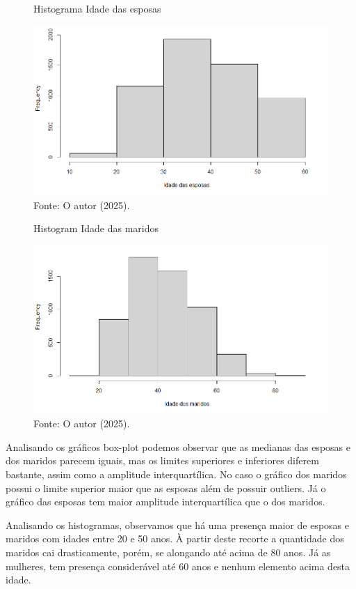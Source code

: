 \begin{figure}[H]
\centering
\caption{Histograma Idade das esposas}
\includegraphics[width=1\linewidth]{apendices/fig/4_IAA004_3.png}
\caption*{Fonte: O autor (2025).}
\end{figure}
\begin{figure}[H]
\centering
\caption{Histogram Idade das maridos}
\includegraphics[width=1\linewidth]{apendices/fig/4_IAA004_4.png}
\caption*{Fonte: O autor (2025).}
\end{figure}

Analisando os gráficos box-plot podemos observar que as medianas das esposas e dos maridos parecem iguais, mas os limites superiores e inferiores diferem bastante, assim como a amplitude interquartílica. No caso o gráfico dos maridos possui o limite superior maior que as esposas além de possuir outliers. Já o gráfico das esposas tem maior amplitude interquartílica que o dos maridos.

Analisando os histogramas, observamos que há uma presença maior de esposas e maridos com idades entre 20 e 50 anos. À partir deste recorte a quantidade dos maridos cai drasticamente, porém, se alongando até acima de 80 anos. Já as mulheres, tem presença considerável até 60 anos e nenhum elemento acima desta idade. 

